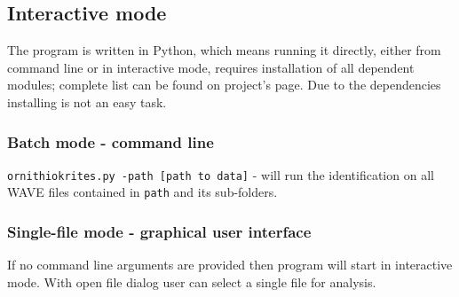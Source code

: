 \documentclass[paper=a4, fontsize=11pt]{scrartcl}	%
\numberwithin{equation}{section}		%
\numberwithin{figure}{section}			%
\numberwithin{table}{section}				%
\begin{document}
\subsection{Interactive mode}
\label{sec:interactive_mode}
The program is written in Python, which means running it directly, either from command line or in interactive mode, requires installation of all dependent modules; complete list can be found on project's page. Due to the dependencies installing is not an easy task.
\subsubsection{Batch mode - command line}
\texttt{ornithiokrites.py -path [path to data]} - will run the identification on all WAVE files contained in \texttt{path} and its sub-folders.
\subsubsection{Single-file mode - graphical user interface}
If no command line arguments are provided then program will start in interactive mode. With open file dialog user can select a single file for analysis.
\end{document}

